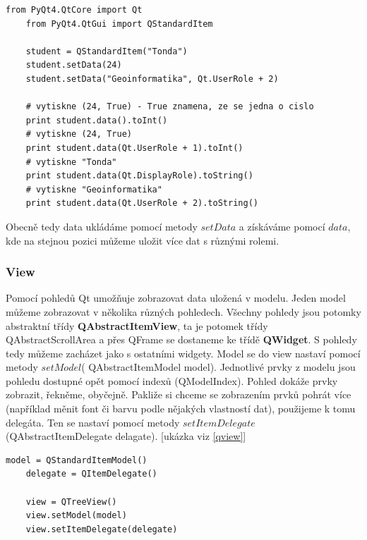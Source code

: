 \begin{lstlisting}[label=qstandarditem,caption={QStandardItem - vytvoření a získání dat}, morekeywords={PyQt4, QtCore, QtGui, QStandardItem, Qt, Qt.UserRole, Qt.DisplayRole}]
	from PyQt4.QtCore import Qt
	from PyQt4.QtGui import QStandardItem

	student = QStandardItem("Tonda")
	student.setData(24)
	student.setData("Geoinformatika", Qt.UserRole + 2)

	# vytiskne (24, True) - True znamena, ze se jedna o cislo
	print student.data().toInt() 					
	# vytiskne (24, True)
	print student.data(Qt.UserRole + 1).toInt()		
	# vytiskne "Tonda"
	print student.data(Qt.DisplayRole).toString() 	
	# vytiskne "Geoinformatika"
	print student.data(Qt.UserRole + 2).toString() 	

\end{lstlisting}

Obecně tedy data ukládáme pomocí metody $setData$ a získáváme pomocí $data$, kde na stejnou pozici můžeme uložit více dat s různými rolemi.
 
\subsubsection*{View}

Pomocí pohledů Qt umožňuje zobrazovat data uložená v modelu. Jeden model můžeme zobrazovat v několika různých pohledech. Všechny pohledy jsou potomky abstraktní třídy \textbf{QAbstractItemView}, ta je potomek třídy QAbstractScrollArea a přes QFrame se dostaneme ke třídě \textbf{QWidget}. S pohledy tedy můžeme zacházet jako s ostatními widgety. Model se do view nastaví pomocí metody $setModel$( QAbstractItemModel model). Jednotlivé prvky z modelu jsou pohledu dostupné opět pomocí indexů (QModelIndex). Pohled dokáže prvky zobrazit, řekněme, obyčejně. Pakliže si chceme se zobrazením prvků pohrát více (například měnit font či barvu podle nějakých vlastností dat), použijeme k tomu delegáta. Ten se nastaví pomocí metody $setItemDelegate$(QAbstractItemDelegate delagate). [ukázka viz \ref{qview}] \\

\begin{lstlisting}[label=qview,caption={View - vytvoření pohledu a nastavení modelu a delegáta}, morekeywords={QItemDelegate, QStandardItemModel, QTreeView}]
	model = QStandardItemModel()
	delegate = QItemDelegate()

	view = QTreeView()
	view.setModel(model)
	view.setItemDelegate(delegate)
\end{lstlisting}


